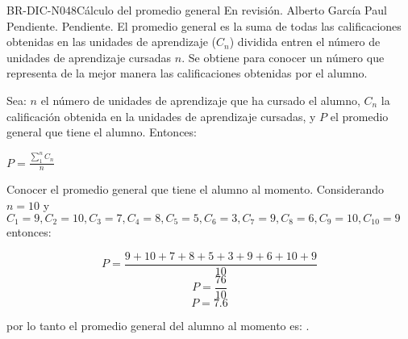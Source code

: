 \begin{BusinessRule}{BR-DIC-N048}{Cálculo del promedio general}
	{\bcCondition} %
	{\btTimer}     %
	{\blInfluencing}     %
	\BRItem[Estado] En revisión.
	  Alberto García Paul
	 Pendiente.
	 Pendiente.
	\BRItem[Descripción] El promedio general es la suma de todas las calificaciones obtenidas en las unidades de aprendizaje ($C_{n}$) dividida entren el número de unidades de aprendizaje cursadas $n$. Se obtiene para conocer un número que representa de la mejor manera las calificaciones obtenidas por el alumno.\begin{flushright}
		
	\end{flushright}
	\BRItem[Sentencia] \cdtEmpty
	Sea: $n$ el número de unidades de aprendizaje que ha cursado el alumno, $C_{n}$ la calificación obtenida en la unidades de aprendizaje cursadas, y $P$ el promedio general que tiene el alumno.
	Entonces:
	\begin{center}
		$P=\frac{\sum\limits_{1}^{n}C_{n}}{n}$
	\end{center} 
	\BRItem[Motivación] Conocer el promedio general que tiene el alumno al momento.
	\BRItem[Ejemplo 1] \cdtEmpty
	Considerando $n=10$ y $C_{1}=9, C_{2}=10, C_{3}=7, C_{4}=8, C_{5}=5, C_{6}=3, C_{7}=9, C_{8}=6, C_{9}=10, C_{10}=9$ \\
	entonces:
	\begin{center}
		\[P=\frac{9+10+7+8+5+3+9+6+10+9}{10}\] 
		\[P=\frac{76}{10}\] 
		\[P=7.6\]
	\end{center}
	por lo tanto el promedio general del alumno al momento es: . 
\end{BusinessRule}

